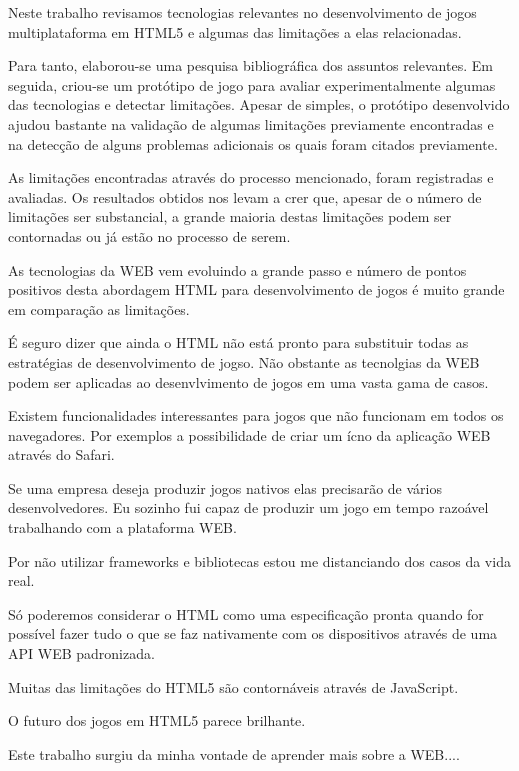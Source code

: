 \begin{draft}

Neste trabalho revisamos tecnologias relevantes no desenvolvimento
de jogos multiplataforma em HTML5 e algumas das limitações a elas
relacionadas.

Para tanto, elaborou-se uma pesquisa bibliográfica
dos assuntos relevantes. Em seguida, criou-se um protótipo de jogo
para avaliar experimentalmente algumas das tecnologias e detectar
limitações. Apesar de simples, o protótipo desenvolvido ajudou
bastante na validação de algumas limitações previamente encontradas
e na detecção de alguns problemas adicionais os quais foram citados
previamente.

As limitações encontradas através do processo mencionado, foram
registradas e avaliadas. Os resultados obtidos nos levam a crer que,
apesar de o número de limitações ser substancial, a grande maioria
destas limitações podem ser contornadas ou já estão no processo de
serem.

As tecnologias da WEB vem evoluindo a grande passo e número de pontos
positivos desta abordagem HTML para desenvolvimento de jogos é muito
grande em comparação as limitações.


É seguro dizer que ainda o HTML não está pronto para substituir todas
as estratégias de desenvolvimento de jogso. Não obstante as tecnolgias
da WEB podem ser aplicadas ao desenvlvimento de jogos em uma vasta gama
de casos.

Existem funcionalidades interessantes para jogos que não funcionam em
todos os navegadores. Por exemplos a possibilidade de criar um ícno da
aplicação WEB através do Safari.



Se uma empresa deseja produzir jogos nativos elas precisarão de vários
desenvolvedores. Eu sozinho fui capaz de produzir um jogo em tempo
razoável trabalhando com a plataforma WEB.

Por não utilizar frameworks e bibliotecas estou me distanciando
dos casos da vida real.

Só poderemos considerar o HTML como uma especificação pronta quando
for possível fazer tudo o que se faz nativamente com os dispositivos
através de uma API WEB padronizada.



Muitas das limitações do HTML5 são contornáveis através de JavaScript.

O futuro dos jogos em HTML5 parece brilhante.


Este trabalho surgiu da minha vontade de aprender mais sobre a WEB....


\end{draft}
